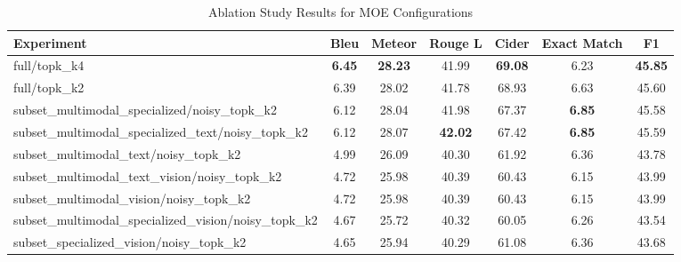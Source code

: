 \begin{table}[h]
\centering
\caption{Ablation Study Results for MOE Configurations}
\label{tab:ablation}
\begin{tabular}{lcccccc}
\toprule
Experiment & Bleu & Meteor & Rouge L & Cider & Exact Match & F1 \\
\midrule
full/topk\_k4 & \textbf{6.45} & \textbf{28.23} & 41.99 & \textbf{69.08} & 6.23 & \textbf{45.85} \\
full/topk\_k2 & 6.39 & 28.02 & 41.78 & 68.93 & 6.63 & 45.60 \\
subset\_multimodal\_specialized/noisy\_topk\_k2 & 6.12 & 28.04 & 41.98 & 67.37 & \textbf{6.85} & 45.58 \\
subset\_multimodal\_specialized\_text/noisy\_topk\_k2 & 6.12 & 28.07 & \textbf{42.02} & 67.42 & \textbf{6.85} & 45.59 \\
subset\_multimodal\_text/noisy\_topk\_k2 & 4.99 & 26.09 & 40.30 & 61.92 & 6.36 & 43.78 \\
subset\_multimodal\_text\_vision/noisy\_topk\_k2 & 4.72 & 25.98 & 40.39 & 60.43 & 6.15 & 43.99 \\
subset\_multimodal\_vision/noisy\_topk\_k2 & 4.72 & 25.98 & 40.39 & 60.43 & 6.15 & 43.99 \\
subset\_multimodal\_specialized\_vision/noisy\_topk\_k2 & 4.67 & 25.72 & 40.32 & 60.05 & 6.26 & 43.54 \\
subset\_specialized\_vision/noisy\_topk\_k2 & 4.65 & 25.94 & 40.29 & 61.08 & 6.36 & 43.68 \\
\bottomrule
\end{tabular}
\end{table}
